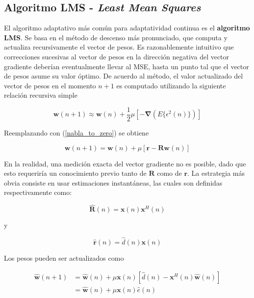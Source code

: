 \subsection{Algoritmo LMS - \textit{Least Mean Squares}}

El algoritmo adaptativo más común para adaptatividad continua es el \textbf{algoritmo LMS}. Se basa en el método de descenso más pronunciado, que computa y actualiza recursivamente el vector de pesos. Es razonablemente intuitivo que correcciones sucesivas al vector de pesos en la dirección negativa del vector gradiente deberían eventualmente llevar al MSE, hasta un punto tal que el vector de pesos asume su valor óptimo. De acuerdo al método, el valor actualizado del vector de pesos en el momento $n + 1$ es computado utilizando la siguiente relación recursiva simple

\begin{equation}
\mathbf{w}(n + 1) \approx \mathbf{w}(n) + \frac{1}{2} \mu [-\mathbf{\nabla}(E\{\epsilon^2(n)\})]
\end{equation}

Reemplazando con (\ref{nabla_to_zero}) se obtiene

\begin{equation}
\mathbf{w}(n + 1) = \mathbf{w}(n) + \mu [\mathbf{r} - \mathbf{R w}(n)]
\end{equation}

En la realidad, una medición exacta del vector gradiente no es posible, dado que esto requeriría un conocimiento previo tanto de $\mathbf{R}$ como de $\mathbf{r}$. La estrategia más obvia consiste en usar estimaciones instantáneas, las cuales son definidas respectivamente como:

\begin{equation}
\mathbf{\hat{R}}(n) = \mathbf{x}(n) \mathbf{x}^H(n)
\end{equation}

y

\begin{equation}
\mathbf{\hat{r}}(n) = \hat{d}(n) \mathbf{x}(n)
\end{equation}

Los pesos pueden ser actualizados como

\begin{align}
\mathbf{\hat{w}}(n + 1) &= \mathbf{\hat{w}}(n) + \mu \mathbf{x}(n)[\hat{d}(n) - \mathbf{x}^H(n)\mathbf{\hat{w}}(n)] \\
                        &= \mathbf{\hat{w}}(n) + \mu \mathbf{x}(n) \hat{e}(n) \nonumber 
\end{align}


